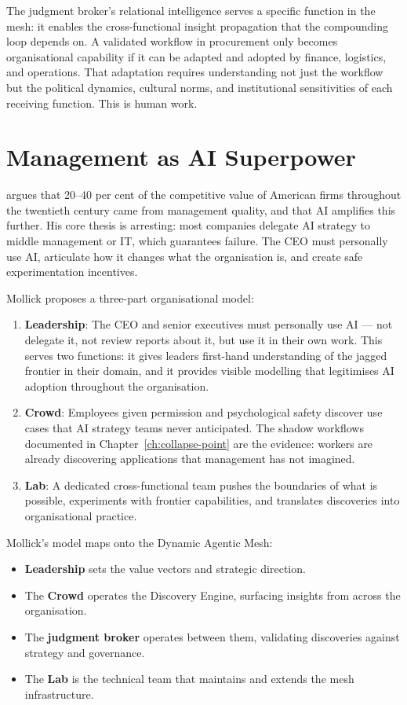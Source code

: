 The judgment broker's relational intelligence serves a specific function in the mesh: it enables the cross-functional insight propagation that the compounding loop depends on. A validated workflow in procurement only becomes organisational capability if it can be adapted and adopted by finance, logistics, and operations. That adaptation requires understanding not just the workflow but the political dynamics, cultural norms, and institutional sensitivities of each receiving function. This is human work.

\section{Management as AI Superpower}

\textcite{Mollick2025Management} argues that 20--40 per cent of the competitive value of American firms throughout the twentieth century came from management quality, and that AI amplifies this further. His core thesis is arresting: most companies delegate AI strategy to middle management or IT, which guarantees failure. The CEO must personally use AI, articulate how it changes what the organisation is, and create safe experimentation incentives.

Mollick proposes a three-part organisational model:

\begin{enumerate}
  \item \textbf{Leadership}: The CEO and senior executives must personally use AI --- not delegate it, not review reports about it, but use it in their own work. This serves two functions: it gives leaders first-hand understanding of the jagged frontier in their domain, and it provides visible modelling that legitimises AI adoption throughout the organisation.
  \item \textbf{Crowd}: Employees given permission and psychological safety discover use cases that AI strategy teams never anticipated. The shadow workflows documented in Chapter~\ref{ch:collapse-point} are the evidence: workers are already discovering applications that management has not imagined.
  \item \textbf{Lab}: A dedicated cross-functional team pushes the boundaries of what is possible, experiments with frontier capabilities, and translates discoveries into organisational practice.
\end{enumerate}

\begin{keyinsight}
Mollick's model maps onto the Dynamic Agentic Mesh:
\begin{itemize}
  \item \textbf{Leadership} sets the value vectors and strategic direction.
  \item The \textbf{Crowd} operates the Discovery Engine, surfacing insights from across the organisation.
  \item The \textbf{judgment broker} operates between them, validating discoveries against strategy and governance.
  \item The \textbf{Lab} is the technical team that maintains and extends the mesh infrastructure.
\end{itemize}
\end{keyinsight}


